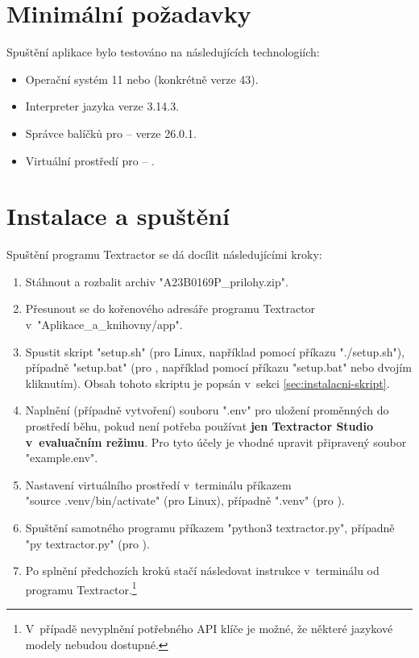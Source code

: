 \documentclass[czech, bc, kiv, he, iso690numb, pdf]{fasthesis}
\begin{document}
\section{Minimální požadavky}
Spuštění aplikace bylo testováno na následujících technologiích:
\begin{itemize}
    \item Operační systém  11 nebo  (konkrétně  verze 43).
    \item Interpreter jazyka  verze 3.14.3.
    \item Správce balíčků pro  --  verze 26.0.1.
    \item Virtuální prostředí pro  -- .
\end{itemize}

\section{Instalace a spuštění}
Spuštění programu Textractor se dá docílit následujícími kroky:
\begin{enumerate}
    \item Stáhnout a rozbalit archiv \filename"A23B0169P_prilohy.zip".
    \item Přesunout se do kořenového adresáře programu Textractor v~\filename"Aplikace_a_knihovny/app".
    \item Spustit skript \command"setup.sh" (pro Linux, například pomocí příkazu \command"./setup.sh"), případně \command"setup.bat" (pro , například pomocí příkazu \command"setup.bat" nebo dvojím kliknutím). Obsah tohoto skriptu je popsán v~sekci \ref{sec:instalacni-skript}.
    \item Naplnění (případně vytvoření) souboru \filename".env" pro uložení proměnných do prostředí běhu, pokud není potřeba používat \textbf{jen Textractor Studio v~evaluačním režimu}. Pro tyto účely je vhodné upravit připravený soubor \filename"example.env".
    \item Nastavení virtuálního prostředí v~terminálu příkazem \\ \command"source .venv/bin/activate" (pro Linux), případně \command".venv\Source\activate" (pro ).
    \item Spuštění samotného programu příkazem \command"python3 textractor.py", případně \command"py textractor.py" (pro ).
    \item Po splnění předchozích kroků stačí následovat instrukce v~terminálu od programu Textractor.\footnote{V~případě nevyplnění potřebného API klíče je možné, že některé jazykové modely nebudou dostupné.}
\end{enumerate}
\end{document}
